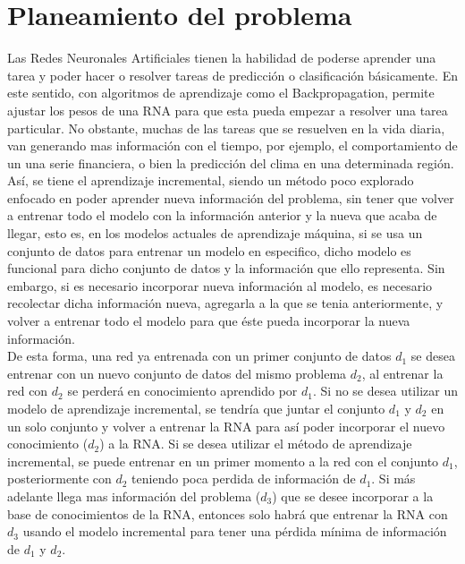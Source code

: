 \chapter{Planeamiento del problema}
	
	
    Las Redes Neuronales Artificiales tienen la habilidad de poderse aprender una tarea 
    y poder hacer o resolver tareas de predicción o clasificación básicamente. En este 
    sentido, con algoritmos de aprendizaje como el Backpropagation, permite ajustar los 
    pesos de una RNA para que esta pueda empezar a resolver una tarea particular.  No 
    obstante, muchas de las tareas que se resuelven en la vida diaria, van generando mas 
    información con el tiempo, por ejemplo, el comportamiento de un una serie financiera, 
    o bien la predicción del clima en una determinada región. Así,  se tiene el aprendizaje 
    incremental, siendo un método poco explorado  enfocado en poder aprender nueva información del 
    problema, sin tener que volver a entrenar todo el modelo con la información anterior y la 
    nueva que acaba de llegar, esto es, en los modelos actuales de aprendizaje máquina, si se usa 
    un conjunto de datos para entrenar un modelo en especifico, dicho modelo es funcional para 
    dicho conjunto de datos y la información que ello representa. Sin embargo, si es necesario 
    incorporar nueva información al modelo, es necesario recolectar dicha información nueva, 
    agregarla a la que se tenia anteriormente, y volver a entrenar todo el modelo para que \'este 
    pueda incorporar la nueva información.\\

    De esta forma, una red ya entrenada con un primer conjunto de datos $d_{1}$ se desea entrenar 
    con un nuevo conjunto de datos del mismo problema $d_{2}$, al entrenar la red con $d_{2}$ se 
    perderá en conocimiento aprendido por $d_{1}$.  Si no se desea utilizar un modelo de aprendizaje 
    incremental, se tendría que juntar el conjunto $d_{1}$ y $d_{2}$ en un solo conjunto y volver a 
    entrenar la RNA para así poder incorporar el nuevo conocimiento ($d_{2}$) a la RNA. Si se desea 
    utilizar el método de aprendizaje incremental, se puede entrenar en un primer momento a la red 
    con el conjunto $d_{1}$, posteriormente con $d_{2}$ teniendo poca perdida de información de $d_{1}$. 
    Si más adelante llega mas información del problema ($d_{3}$) que se desee incorporar a la base 
    de conocimientos de la RNA, entonces solo habrá que entrenar la RNA con $d_{3}$ usando el modelo 
    incremental para tener una p\'erdida mínima de información de $d_{1}$ y $d_{2}$. \\

